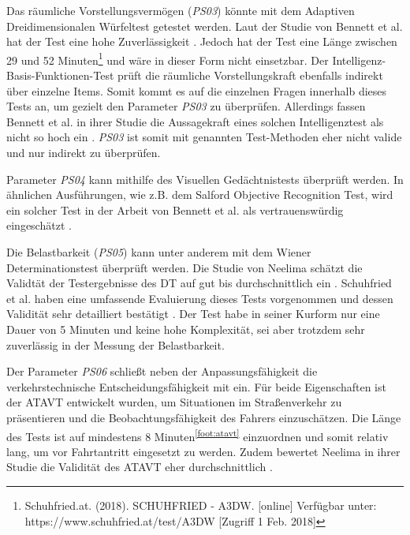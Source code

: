 Das räumliche Vorstellungsvermögen (\textit{PS03}) könnte mit dem Adaptiven Dreidimensionalen Würfeltest getestet werden. Laut der Studie von Bennett et al. hat der Test eine hohe Zuverlässigkeit \cite{cognitivetestsfitnesstodrive}. Jedoch hat der Test eine Länge zwischen 29 und 52 Minuten\footnote{Schuhfried.at. (2018). SCHUHFRIED - A3DW. [online] Verfügbar unter: https://www.schuhfried.at/test/A3DW [Zugriff 1 Feb. 2018]} und wäre in dieser Form nicht einsetzbar. Der Intelligenz-Basis-Funktionen-Test prüft die räumliche Vorstellungskraft ebenfalls indirekt über einzelne Items. Somit kommt es auf die einzelnen Fragen innerhalb dieses Tests an, um gezielt den Parameter \textit{PS03} zu überprüfen. Allerdings fassen Bennett et al. in ihrer Studie die Aussagekraft eines solchen Intelligenztest als nicht so hoch ein \cite{cognitivetestsfitnesstodrive}. \textit{PS03} ist somit mit genannten Test-Methoden eher nicht valide und nur indirekt zu überprüfen.

Parameter \textit{PS04} kann mithilfe des Visuellen Gedächtnistests überprüft werden. In ähnlichen Ausführungen, wie z.B. dem Salford Objective Recognition Test, wird ein solcher Test in der Arbeit von Bennett et al. als vertrauenswürdig eingeschätzt \cite{cognitivetestsfitnesstodrive}.

Die Belastbarkeit (\textit{PS05})  kann unter anderem mit dem Wiener Determinationstest überprüft werden. Die Studie von Neelima schätzt die Validtät der Testergebnisse des DT auf gut bis durchschnittlich ein \cite{indiaassessment}. Schuhfried et al. haben eine umfassende Evaluierung dieses Tests vorgenommen und dessen Validität sehr detailliert bestätigt \cite{wiendt}. Der Test habe in seiner Kurform nur eine Dauer von 5 Minuten und keine hohe Komplexität, sei aber trotzdem sehr zuverlässig in der Messung der Belastbarkeit.

Der Parameter \textit{PS06} schließt neben der Anpassungsfähigkeit die verkehrstechnische Entscheidungsfähigkeit mit ein. Für beide Eigenschaften ist der ATAVT entwickelt wurden, um Situationen im Straßenverkehr zu präsentieren und die Beobachtungsfähigkeit des Fahrers einzuschätzen. Die Länge des Tests ist auf mindestens 8 Minuten\textsuperscript{\ref{foot:atavt}}  einzuordnen und somit relativ lang, um vor Fahrtantritt eingesetzt zu werden. Zudem bewertet Neelima in ihrer Studie die Validität des ATAVT eher durchschnittlich \cite{indiaassessment}.

